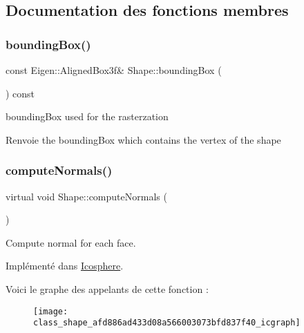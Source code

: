 \subsection{Documentation des fonctions membres}
\mbox{\label{class_shape_acd24561b01d6769b4a0c96cd0237a961}} 
\subsubsection{\texorpdfstring{bounding\+Box()}{boundingBox()}}
{\footnotesize\ttfamily const Eigen\+::\+Aligned\+Box3f\& Shape\+::bounding\+Box (\begin{DoxyParamCaption}{ }\end{DoxyParamCaption}) const\hspace{0.3cm}{\ttfamily [inline]}}



bounding\+Box used for the rasterzation 

\begin{DoxyReturn}{Renvoie}
the bounding\+Box which contains the vertex of the shape 
\end{DoxyReturn}
\mbox{\label{class_shape_afd886ad433d08a566003073bfd837f40}} 
\subsubsection{\texorpdfstring{compute\+Normals()}{computeNormals()}}
{\footnotesize\ttfamily virtual void Shape\+::compute\+Normals (\begin{DoxyParamCaption}{ }\end{DoxyParamCaption})\hspace{0.3cm}{\ttfamily [pure virtual]}}



Compute normal for each face. 



Implémenté dans \hyperlink{class_icosphere_af7d6c8c60248794f6a6c382dc5f98a24}{Icosphere}.

Voici le graphe des appelants de cette fonction \+:\nopagebreak
\begin{figure}[H]
\begin{center}
\leavevmode
\texttt{[image: class\_shape\_afd886ad433d08a566003073bfd837f40\_icgraph]}
\end{center}
\end{figure}
\mbox{\label{class_shape_aeeb67de72adb9667c1eb48129f3e5ffb}} 
